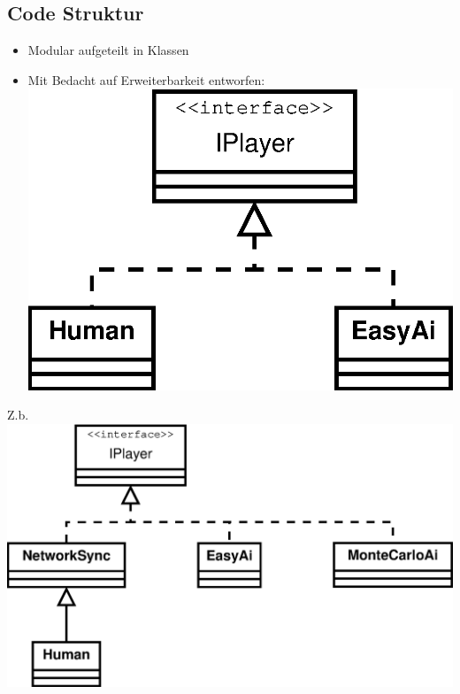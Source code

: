 \documentclass[12pt, draft]{beamer}
\begin{document}
\subsection{Code Struktur}
\begin{frame}
	\begin{itemize}
		\item Modular aufgeteilt in Klassen
		\item Mit Bedacht auf Erweiterbarkeit entworfen:\\ \vspace*{5pt}
			\includegraphics[width=0.5\linewidth]{media/structure1.eps}
	\end{itemize}
\end{frame}
\begin{frame}
	Z.b.\\ \vspace*{5pt}
	\includegraphics[width=0.8\linewidth]{media/structure2.eps}
\end{frame}
\end{document}
